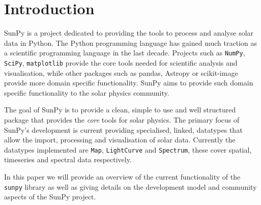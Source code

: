 \section{Introduction}
SunPy is a project dedicated to providing the tools to process and analyse 
solar data in Python.
The Python programming language has gained much traction as a scientific 
programming language in the last decade.
Projects such as \texttt{NumPy}, \texttt{SciPy}, \texttt{matplotlib} provide 
the core tools needed for scientific analysis and visualisation, while other 
packages such as pandas, Astropy or scikit-image provide more domain specific 
functionality. SunPy aims to provide such domain specific functionality to the 
solar physics community.

The goal of SunPy is to provide a clean, simple to use and well structured 
package that provides the \textit{core} tools for solar physics.
The primary focus of SunPy's development is current providing specialised, 
linked, datatypes that allow the import, processing and visualisation of solar 
data. Currently the datatypes implemented are \texttt{Map}, \texttt{LightCurve} 
and \texttt{Spectrum}, these cover spatial, timeseries and spectral data 
respectively.

In this paper we will provide an overview of the current functionality of the 
\texttt{sunpy} library as well as giving details on the development model and 
community aspects of the SunPy project.